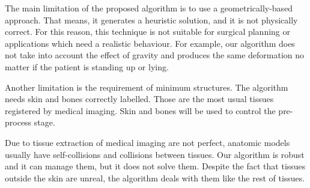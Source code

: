 The main limitation of the proposed algorithm is to use a geometrically-based approach. That means, it generates a heuristic solution, and it is not physically correct. For this reason, this technique is not suitable for surgical planning or applications which need a realistic behaviour. For example, our algorithm does not take into account the effect of gravity and produces the same deformation no matter if the patient is standing up or lying.


Another limitation is the requirement of minimum structures. The algorithm needs skin and bones correctly labelled. Those are the most usual tissues registered by medical imaging. Skin and bones will be used to control the pre-process stage.
    
Due to tissue extraction of medical imaging are not perfect, anatomic models usually have self-collisions and collisions between tissues. Our algorithm is robust and it can manage them, but it does not solve them. Despite the fact that tissues outside the skin are unreal, the algorithm deals with them like the rest of tissues.
    


